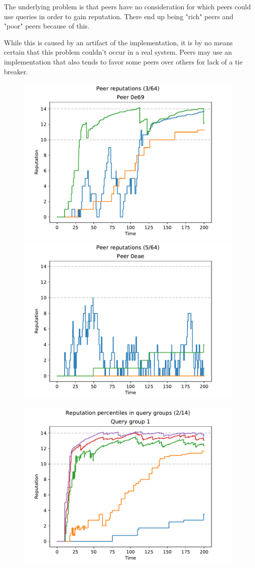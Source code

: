 The underlying problem is that peers have no consideration for which peers could
use queries in order to gain reputation. There end up being "rich" peers and
"poor" peers because of this.

While this is caused by an artifact of the implementation, it is by no means
certain that this problem couldn't occur in a real system. Peers may use an
implementation that also tends to favor some peers over others for lack of a tie
breaker.

\begin{figure}[t]
\centering
\includegraphics[width=0.5\columnwidth]{figures/selection_overlap_peer_reps_3_of_64}%
\includegraphics[width=0.5\columnwidth]{figures/selection_overlap_peer_reps_5_of_64}
\label{fig:selection_overlap_peer_reps}
\end{figure}

\begin{figure}[t]
\centering
\includegraphics[width=1\columnwidth]{figures/selection_overlap_rep_percs_2_of_14}
\label{fig:selection_overlap_rep_percs}
\end{figure}

